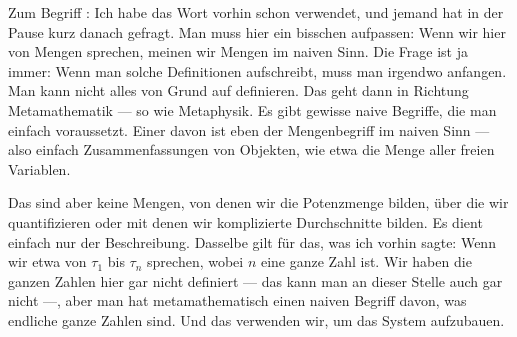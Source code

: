 \begin{math-stroke}
\end{math-stroke}

\begin{ai-global-state-checkpoint-invisible-content}
\end{ai-global-state-checkpoint-invisible-content}

\begin{spoken-clean}[01:08:27 - 01:11:27]
Zum Begriff : Ich habe das Wort vorhin schon verwendet, und jemand hat in der Pause kurz danach gefragt. Man muss hier ein bisschen aufpassen: Wenn wir hier von Mengen sprechen, meinen wir Mengen im naiven Sinn. Die Frage ist ja immer: Wenn man solche Definitionen aufschreibt, muss man irgendwo anfangen. Man kann nicht alles von Grund auf definieren. Das geht dann in Richtung Metamathematik --- so wie Metaphysik. Es gibt gewisse naive Begriffe, die man einfach voraussetzt. Einer davon ist eben der Mengenbegriff im naiven Sinn --- also einfach Zusammenfassungen von Objekten, wie etwa die Menge aller freien Variablen.

Das sind aber keine Mengen, von denen wir die Potenzmenge bilden, über die wir quantifizieren oder mit denen wir komplizierte Durchschnitte bilden. Es dient einfach nur der Beschreibung. Dasselbe gilt für das, was ich vorhin sagte: Wenn wir etwa von $\tau_1$ bis $\tau_n$ sprechen, wobei $n$ eine ganze Zahl ist. Wir haben die ganzen Zahlen hier gar nicht definiert --- das kann man an dieser Stelle auch gar nicht ---, aber man hat metamathematisch einen naiven Begriff davon, was endliche ganze Zahlen sind. Und das verwenden wir, um das System aufzubauen.
\end{spoken-clean}


